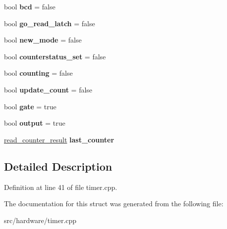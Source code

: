 \begin{DoxyCompactItemize}
\item 
\hypertarget{structPIT__Block_a8ddc522280bb994ea634aa855470836e}{bool {\bfseries bcd} = false}\label{structPIT__Block_a8ddc522280bb994ea634aa855470836e}

\item 
\hypertarget{structPIT__Block_a7a715f03e1acc563935446865c6ff565}{bool {\bfseries go\-\_\-read\-\_\-latch} = false}\label{structPIT__Block_a7a715f03e1acc563935446865c6ff565}

\item 
\hypertarget{structPIT__Block_acf24bddaa36c23e46f27c9b7127707a3}{bool {\bfseries new\-\_\-mode} = false}\label{structPIT__Block_acf24bddaa36c23e46f27c9b7127707a3}

\item 
\hypertarget{structPIT__Block_a048abc116ac6c60acfc407a6274a69ae}{bool {\bfseries counterstatus\-\_\-set} = false}\label{structPIT__Block_a048abc116ac6c60acfc407a6274a69ae}

\item 
\hypertarget{structPIT__Block_a22b10292f287bf33a2c5b456dce9bddc}{bool {\bfseries counting} = false}\label{structPIT__Block_a22b10292f287bf33a2c5b456dce9bddc}

\item 
\hypertarget{structPIT__Block_a81813382e0d2d0d1c79cf97713ae68df}{bool {\bfseries update\-\_\-count} = false}\label{structPIT__Block_a81813382e0d2d0d1c79cf97713ae68df}

\item 
\hypertarget{structPIT__Block_a4207ed587f5c51acadcbea33ef324368}{bool {\bfseries gate} = true}\label{structPIT__Block_a4207ed587f5c51acadcbea33ef324368}

\item 
\hypertarget{structPIT__Block_aba70d7b051f82e064e7da0193f225e43}{bool {\bfseries output} = true}\label{structPIT__Block_aba70d7b051f82e064e7da0193f225e43}

\item 
\hypertarget{structPIT__Block_aa531b7f189242b699b2655b1069b2527}{\hyperlink{structPIT__Block_1_1read__counter__result}{read\-\_\-counter\-\_\-result} {\bfseries last\-\_\-counter}}\label{structPIT__Block_aa531b7f189242b699b2655b1069b2527}

\end{DoxyCompactItemize}


\subsection{Detailed Description}


Definition at line 41 of file timer.\-cpp.



The documentation for this struct was generated from the following file\-:\begin{DoxyCompactItemize}
\item 
src/hardware/timer.\-cpp\end{DoxyCompactItemize}

